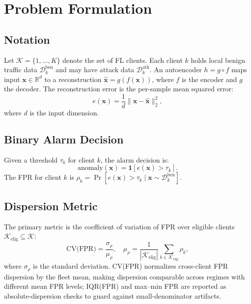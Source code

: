 \section{Problem Formulation}
\label{sec:formulation}

\subsection{Notation}
Let $\mathcal{K}=\{1,\dots,K\}$ denote the set of FL clients.
Each client $k$ holds local benign traffic data $\mathcal{D}_k^{\text{ben}}$ and may have
attack data $\mathcal{D}_k^{\text{atk}}$.
An autoencoder $h = g \circ f$ maps input $\mathbf{x} \in \mathbb{R}^d$ to a reconstruction
$\hat{\mathbf{x}} = g(f(\mathbf{x}))$, where $f$ is the encoder and $g$ the decoder.
The reconstruction error is the per-sample mean squared error:
\begin{equation}
  e(\mathbf{x}) = \frac{1}{d}\|\mathbf{x} - \hat{\mathbf{x}}\|_2^2,
\end{equation}
where $d$ is the input dimension.

\subsection{Binary Alarm Decision}
Given a threshold $\tau_k$ for client $k$, the alarm decision is:
\begin{equation}
  \text{anomaly}(\mathbf{x}) = \mathbf{1}[e(\mathbf{x}) > \tau_k].
\end{equation}
The FPR for client $k$ is $\rho_k = \Pr[e(\mathbf{x}) > \tau_k \mid \mathbf{x} \sim \mathcal{D}_k^{\text{ben}}]$.

\subsection{Dispersion Metric}
The primary metric is the coefficient of variation of FPR over eligible clients
$\mathcal{K}_{\mathrm{elig}} \subseteq \mathcal{K}$:
\begin{equation}
  \text{CV(FPR)} = \frac{\sigma_{\rho}}{\mu_{\rho}},\quad
  \mu_{\rho} = \frac{1}{|\mathcal{K}_{\mathrm{elig}}|}\sum_{k\in\mathcal{K}_{\mathrm{elig}}} \rho_k,
\end{equation}
where $\sigma_{\rho}$ is the standard deviation.
CV(FPR) normalizes cross-client FPR dispersion by the fleet mean, making dispersion
comparable across regimes with different mean FPR levels; IQR(FPR) and
max--min FPR are reported as absolute-dispersion checks to guard against small-denominator artifacts.

